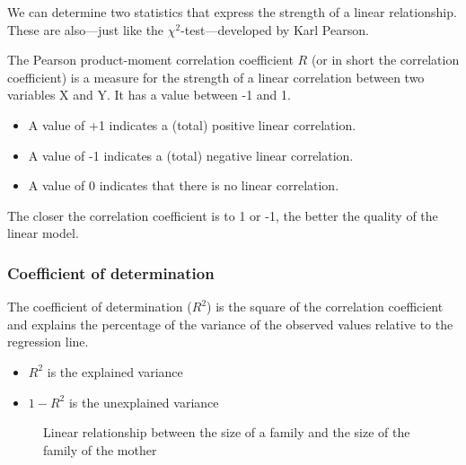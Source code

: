 We can determine two statistics that express the strength of a linear relationship. These are also---just like the $\chi^2$-test---developed by Karl Pearson.

\begin{definition}
  The Pearson product-moment correlation coefficient $R$ (or in short the correlation coefficient) is a measure for the strength of a linear correlation between two variables X and Y. It has a value between -1 and 1.
  
  \begin{itemize}
    \item A value of +1 indicates a (total) positive linear correlation.
    \item A value of -1 indicates a (total) negative linear correlation.
    \item A value of 0 indicates that there is no linear correlation.
  \end{itemize}
  
  The closer the correlation coefficient is to 1 or -1, the better the quality of the linear model.
\end{definition}

\subsubsection{Coefficient of determination}

\begin{definition}
  The coefficient of determination ($R^{2}$) is the square of the correlation coefficient and explains the percentage of the variance of the observed values relative to the regression line.

  \begin{itemize}
    \item $R^{2}$ is the explained variance
    \item $1-R^{2}$ is the unexplained variance
  \end{itemize}
\end{definition}

\begin{figure}[t]
  \caption{Linear relationship between the size of a family and the size of the family of the mother}
  \label{fig:motherRelationship}
\end{figure}

